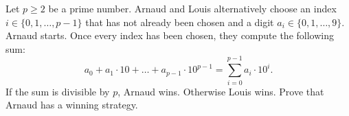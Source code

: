 Let $p\geq 2$ be a prime number.
Arnaud and Louis alternatively choose an index $i\in \{0,1,\ldots,p-1\}$
that has not already been chosen and a digit $a_i\in\{0,1,\ldots,9\}$.
Arnaud starts.
Once every index has been chosen, they compute the following sum:
$$a_0+a_1\cdot 10+\ldots+a_{p-1}\cdot 10^{p-1}=\sum_{i=0}^{p-1}a_i\cdot 10^i.$$
If the sum is divisible by $p$, Arnaud wins.
Otherwise Louis wins.
Prove that Arnaud has a winning strategy.

